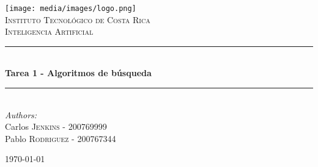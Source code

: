 \newcommand{\HRule}{\rule{\linewidth}{0.5mm}}

\begin{titlepage}
\begin{center}

\texttt{[image: media/images/logo.png]}\\[1cm]
\textsc{\LARGE Instituto Tecnológico de Costa Rica}\\[1.5cm]
\textsc{\Large Inteligencia Artificial}\\[0.5cm]


\HRule \\[0.4cm]
{ \huge \bfseries Tarea 1 - Algoritmos de búsqueda}\\[0.4cm]
\HRule \\[1.5cm]


\emph{Authors:}\\
Carlos \textsc{Jenkins} - 200769999\\
Pablo \textsc{Rodriguez} - 200767344\\

\vfill

{\large \today}

\end{center}
\end{titlepage}


